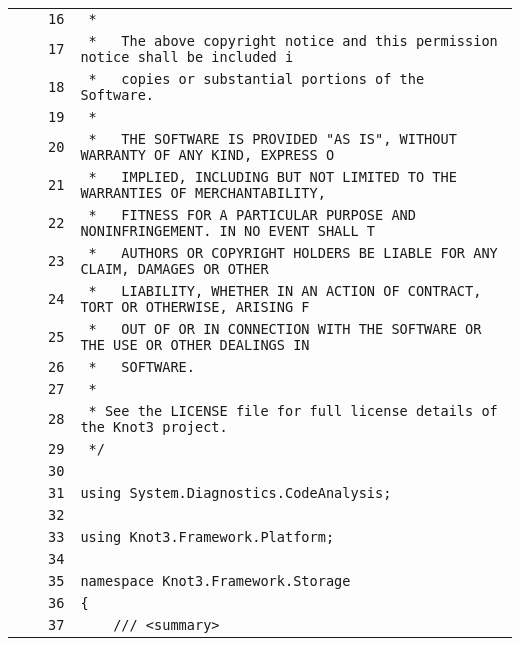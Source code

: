 \documentclass[a4paper,10pt]{article}
\begin{document}
\begin{longtable}[l]{lrrl}
\cellcolor{gray} &  & \verb~16~ & \verb~ *~\\
\cellcolor{gray} &  & \verb~17~ & \verb~ *   The above copyright notice and this permission notice shall be included i~\\
\cellcolor{gray} &  & \verb~18~ & \verb~ *   copies or substantial portions of the Software.~\\
\cellcolor{gray} &  & \verb~19~ & \verb~ *~\\
\cellcolor{gray} &  & \verb~20~ & \verb~ *   THE SOFTWARE IS PROVIDED "AS IS", WITHOUT WARRANTY OF ANY KIND, EXPRESS O~\\
\cellcolor{gray} &  & \verb~21~ & \verb~ *   IMPLIED, INCLUDING BUT NOT LIMITED TO THE WARRANTIES OF MERCHANTABILITY,~\\
\cellcolor{gray} &  & \verb~22~ & \verb~ *   FITNESS FOR A PARTICULAR PURPOSE AND NONINFRINGEMENT. IN NO EVENT SHALL T~\\
\cellcolor{gray} &  & \verb~23~ & \verb~ *   AUTHORS OR COPYRIGHT HOLDERS BE LIABLE FOR ANY CLAIM, DAMAGES OR OTHER~\\
\cellcolor{gray} &  & \verb~24~ & \verb~ *   LIABILITY, WHETHER IN AN ACTION OF CONTRACT, TORT OR OTHERWISE, ARISING F~\\
\cellcolor{gray} &  & \verb~25~ & \verb~ *   OUT OF OR IN CONNECTION WITH THE SOFTWARE OR THE USE OR OTHER DEALINGS IN~\\
\cellcolor{gray} &  & \verb~26~ & \verb~ *   SOFTWARE.~\\
\cellcolor{gray} &  & \verb~27~ & \verb~ *~\\
\cellcolor{gray} &  & \verb~28~ & \verb~ * See the LICENSE file for full license details of the Knot3 project.~\\
\cellcolor{gray} &  & \verb~29~ & \verb~ */~\\
\cellcolor{gray} &  & \verb~30~ & \verb~~\\
\cellcolor{gray} &  & \verb~31~ & \verb~using System.Diagnostics.CodeAnalysis;~\\
\cellcolor{gray} &  & \verb~32~ & \verb~~\\
\cellcolor{gray} &  & \verb~33~ & \verb~using Knot3.Framework.Platform;~\\
\cellcolor{gray} &  & \verb~34~ & \verb~~\\
\cellcolor{gray} &  & \verb~35~ & \verb~namespace Knot3.Framework.Storage~\\
\cellcolor{gray} &  & \verb~36~ & \verb~{~\\
\cellcolor{gray} &  & \verb~37~ & \verb~    /// <summary>~\\

\end{longtable}
\end{document}
